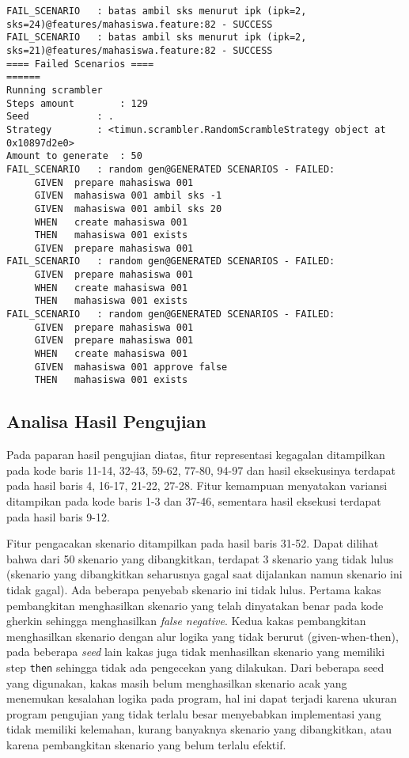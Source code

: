 \begin{lstlisting}[language=testresult]
FAIL_SCENARIO	: batas ambil sks menurut ipk (ipk=2, sks=24)@features/mahasiswa.feature:82 - SUCCESS
FAIL_SCENARIO	: batas ambil sks menurut ipk (ipk=2, sks=21)@features/mahasiswa.feature:82 - SUCCESS
==== Failed Scenarios ====
======
Running scrambler
Steps amount		: 129
Seed			: .
Strategy		: <timun.scrambler.RandomScrambleStrategy object at 0x10897d2e0>
Amount to generate	: 50
FAIL_SCENARIO	: random gen@GENERATED SCENARIOS - FAILED:
	 GIVEN	prepare mahasiswa 001
	 GIVEN	mahasiswa 001 ambil sks -1
	 GIVEN	mahasiswa 001 ambil sks 20
	 WHEN	create mahasiswa 001
	 THEN	mahasiswa 001 exists
	 GIVEN	prepare mahasiswa 001
FAIL_SCENARIO	: random gen@GENERATED SCENARIOS - FAILED:
	 GIVEN	prepare mahasiswa 001
	 WHEN	create mahasiswa 001
	 THEN	mahasiswa 001 exists
FAIL_SCENARIO	: random gen@GENERATED SCENARIOS - FAILED:
	 GIVEN	prepare mahasiswa 001
	 GIVEN	prepare mahasiswa 001
	 WHEN	create mahasiswa 001
	 GIVEN	mahasiswa 001 approve false
	 THEN	mahasiswa 001 exists
\end{lstlisting}


\subsection{Analisa Hasil Pengujian}

Pada paparan hasil pengujian diatas, fitur representasi kegagalan ditampilkan pada kode baris 11-14,
32-43, 59-62, 77-80, 94-97 dan hasil eksekusinya terdapat pada hasil baris 4, 16-17, 21-22, 27-28.
Fitur kemampuan menyatakan variansi ditampikan pada kode baris 1-3 dan 37-46, sementara hasil eksekusi
terdapat pada hasil baris 9-12.

Fitur pengacakan skenario ditampilkan pada hasil baris 31-52. Dapat dilihat bahwa dari 50 skenario yang dibangkitkan,
terdapat 3 skenario yang tidak lulus (skenario yang dibangkitkan seharusnya gagal saat dijalankan namun skenario ini tidak gagal).
Ada beberapa penyebab skenario ini tidak lulus.
Pertama kakas pembangkitan menghasilkan skenario yang telah dinyatakan benar pada kode gherkin sehingga menghasilkan \textit{false negative}.
Kedua kakas pembangkitan menghasilkan skenario dengan alur logika yang tidak berurut (given-when-then), pada beberapa \textit{seed}
lain kakas juga tidak menhasilkan skenario yang memiliki step \texttt{then} sehingga tidak ada pengecekan yang dilakukan.
Dari beberapa seed yang digunakan, kakas masih belum menghasilkan skenario acak yang menemukan kesalahan logika pada program,
hal ini dapat terjadi karena ukuran program pengujian yang tidak terlalu besar menyebabkan implementasi yang tidak memiliki kelemahan,
kurang banyaknya skenario yang dibangkitkan, atau karena pembangkitan skenario yang belum terlalu efektif.

